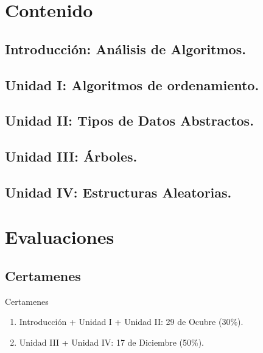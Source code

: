 \documentclass{beamer} %
\begin{document}

\section{Contenido}

\subsection{Introducción: Análisis de Algoritmos.}
\subsection{Unidad I: Algoritmos de ordenamiento.}
\subsection{Unidad II: Tipos de Datos Abstractos.}
\subsection{Unidad III: Árboles.}
\subsection{Unidad IV: Estructuras Aleatorias.}

\section{Evaluaciones}

\subsection{Certamenes}
\begin{frame}
  \begin{block}{Certamenes}
  \begin{enumerate}
    \item Introducción + Unidad I + Unidad II: 29 de Ocubre (30\%).
    \item Unidad III + Unidad IV: 17 de Diciembre (50\%).
  \end{enumerate}

\end{block}
\end{frame}
\end{document}
